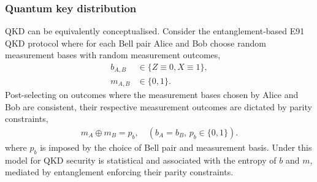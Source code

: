 \documentclass[twocolumn, aps, amsmath, amssymb, nofootinbib, superscriptaddress, longbibliography, doublefloatfix, table-of-contents, eqsecnum, rmp]{revtex4-2}
\begin{document}
\subsubsection{Quantum key distribution}

QKD can be equivalently conceptualised. Consider the entanglement-based E91 QKD protocol where for each Bell pair Alice and Bob choose random measurement bases with random measurement outcomes,
\begin{align}
	b_{A,B} &\in \{Z\equiv 0, X\equiv 1\},\nonumber\\
	m_{A,B} &\in \{0,1\}.
\end{align}
Post-selecting on outcomes where the measurement bases chosen by Alice and Bob are consistent, their respective measurement outcomes are dictated by parity constraints,
\begin{align}
	m_A\oplus m_B = p_b,\quad (b_A=b_B,\, p_b\in\{0,1\}).
\end{align}
where $p_b$ is imposed by the choice of Bell pair and measurement basis. Under this model for QKD security is statistical and associated with the entropy of $b$ and $m$, mediated by entanglement enforcing their parity constraints.


\end{document}
